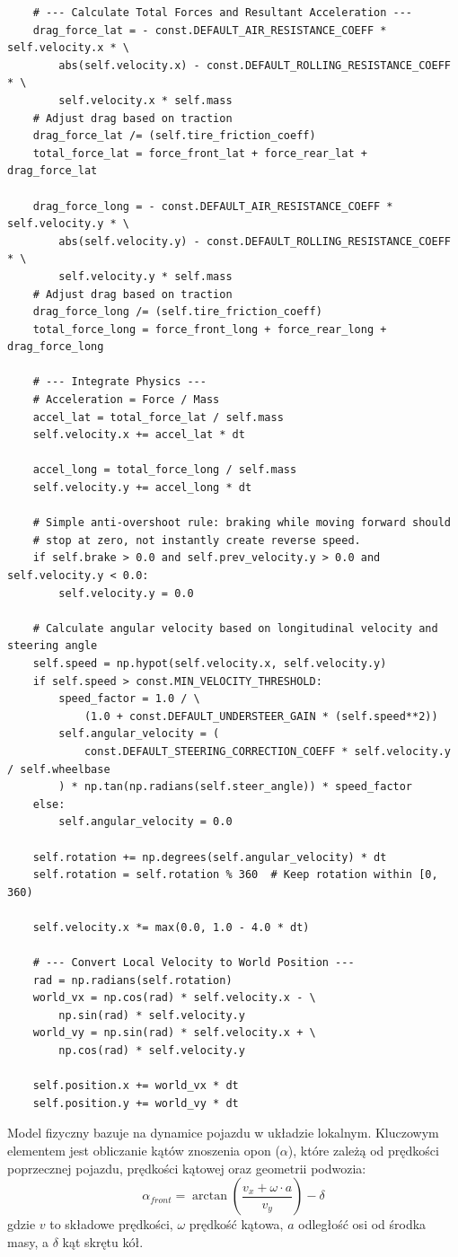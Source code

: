 \documentclass{article}
\begin{document}
\begin{verbatim}
    # --- Calculate Total Forces and Resultant Acceleration ---
    drag_force_lat = - const.DEFAULT_AIR_RESISTANCE_COEFF * self.velocity.x * \
        abs(self.velocity.x) - const.DEFAULT_ROLLING_RESISTANCE_COEFF * \
        self.velocity.x * self.mass
    # Adjust drag based on traction
    drag_force_lat /= (self.tire_friction_coeff)
    total_force_lat = force_front_lat + force_rear_lat + drag_force_lat

    drag_force_long = - const.DEFAULT_AIR_RESISTANCE_COEFF * self.velocity.y * \
        abs(self.velocity.y) - const.DEFAULT_ROLLING_RESISTANCE_COEFF * \
        self.velocity.y * self.mass
    # Adjust drag based on traction
    drag_force_long /= (self.tire_friction_coeff)
    total_force_long = force_front_long + force_rear_long + drag_force_long

    # --- Integrate Physics ---
    # Acceleration = Force / Mass
    accel_lat = total_force_lat / self.mass
    self.velocity.x += accel_lat * dt

    accel_long = total_force_long / self.mass
    self.velocity.y += accel_long * dt

    # Simple anti-overshoot rule: braking while moving forward should
    # stop at zero, not instantly create reverse speed.
    if self.brake > 0.0 and self.prev_velocity.y > 0.0 and self.velocity.y < 0.0:
        self.velocity.y = 0.0

    # Calculate angular velocity based on longitudinal velocity and steering angle
    self.speed = np.hypot(self.velocity.x, self.velocity.y)
    if self.speed > const.MIN_VELOCITY_THRESHOLD:
        speed_factor = 1.0 / \
            (1.0 + const.DEFAULT_UNDERSTEER_GAIN * (self.speed**2))
        self.angular_velocity = (
            const.DEFAULT_STEERING_CORRECTION_COEFF * self.velocity.y / self.wheelbase
        ) * np.tan(np.radians(self.steer_angle)) * speed_factor
    else:
        self.angular_velocity = 0.0

    self.rotation += np.degrees(self.angular_velocity) * dt
    self.rotation = self.rotation % 360  # Keep rotation within [0, 360)

    self.velocity.x *= max(0.0, 1.0 - 4.0 * dt)

    # --- Convert Local Velocity to World Position ---
    rad = np.radians(self.rotation)
    world_vx = np.cos(rad) * self.velocity.x - \
        np.sin(rad) * self.velocity.y
    world_vy = np.sin(rad) * self.velocity.x + \
        np.cos(rad) * self.velocity.y

    self.position.x += world_vx * dt
    self.position.y += world_vy * dt
\end{verbatim}
Model fizyczny bazuje na dynamice pojazdu w układzie lokalnym. Kluczowym elementem jest obliczanie kątów znoszenia opon ($\alpha$), które zależą od prędkości poprzecznej pojazdu, prędkości kątowej oraz geometrii podwozia:
\begin{equation}
    \alpha_{front} = \arctan\left(\frac{v_x + \omega \cdot a}{v_y}\right) - \delta
\end{equation}
gdzie $v$ to składowe prędkości, $\omega$ prędkość kątowa, $a$ odległość osi od środka masy, a $\delta$ kąt skrętu kół.
\end{document}

